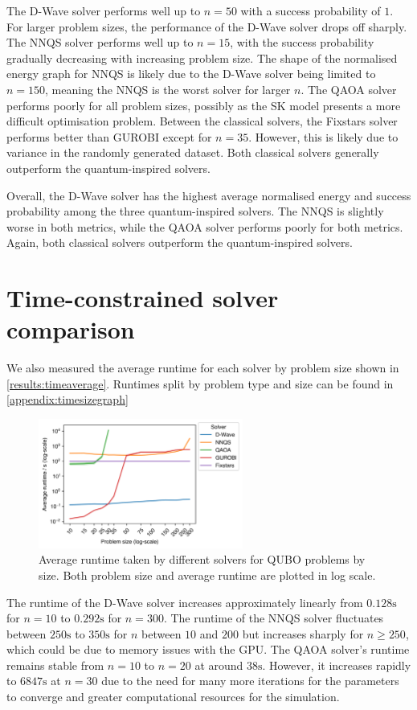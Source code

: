 The D-Wave solver performs well up to $n=50$ with a success probability of $1$. For larger problem sizes, the performance of the D-Wave solver drops off sharply. The NNQS solver performs well up to $n=15$, with the success probability gradually decreasing with increasing problem size. The shape of the normalised energy graph for NNQS is likely due to the D-Wave solver being limited to $n=150$, meaning the NNQS is the worst solver for larger $n$. The QAOA solver performs poorly for all problem sizes, possibly as the SK model presents a more difficult optimisation problem. Between the classical solvers, the Fixstars solver performs better than GUROBI except for $n=35$. However, this is likely due to variance in the randomly generated dataset. Both classical solvers generally outperform the quantum-inspired solvers.

Overall, the D-Wave solver has the highest average normalised energy and success probability among the three quantum-inspired solvers. The NNQS is slightly worse in both metrics, while the QAOA solver performs poorly for both metrics. Again, both classical solvers outperform the quantum-inspired solvers.

\section{Time-constrained solver comparison}
We also measured the average runtime for each solver by problem size shown in \autoref{results:timeaverage}. Runtimes split by problem type and size can be found in \autoref{appendix:timesizegraph}

\begin{figure}[!htb]
    \centering
    \includegraphics[width=0.6\textwidth]{images/all_time_average.png}
    \caption{Average runtime taken by different solvers for QUBO problems by size. Both problem size and average runtime are plotted in log scale.}
    \label{results:timeaverage}
\end{figure}

The runtime of the D-Wave solver increases approximately linearly from $0.128\si{\second}$ for $n=10$ to $0.292\si{\second}$ for $n=300$. The runtime of the NNQS solver fluctuates between $250\si{\second}$ to $350\si{\second}$ for $n$ between $10$ and $200$ but increases sharply for $n \geq 250$, which could be due to memory issues with the GPU. The QAOA solver's runtime remains stable from $n=10$ to $n=20$ at around $38 \si{\second}$. However, it increases rapidly to $6847 \si{\second}$ at $n=30$ due to the need for many more iterations for the parameters to converge and greater computational resources for the simulation.

